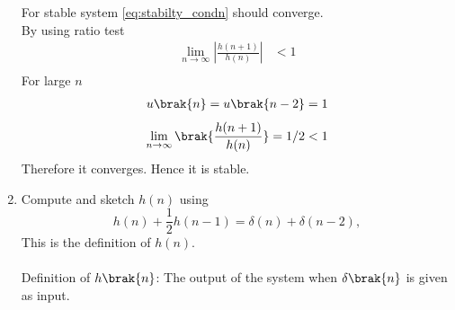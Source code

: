 \documentclass[journal,12pt,twocolumn]{IEEEtran}
\theoremstyle{remark}
\begin{document}
\begin{enumerate}[label=\thesection.\arabic*]
																																																						   \solution For stable system \eqref{eq:stabilty_condn} should converge.\\
																																																						   By using ratio test
																																																						   \begin{align}
																																																						       \lim_{n \to \infty}\left|\frac{h(n + 1)}{h(n)}\right|&<1 \\
																																																						       \end{align}
																																																						       For large $n$ 
																																																						       \begin{align}
																																																						           u\brak{n}=u\brak{n-2}=1
																																																							   \end{align}
																																																							   \begin{align}
																																																							     \lim_{n \to \infty}  \brak{\frac{h(n + 1)}{h(n)}} = 1/2 <1
																																																							     \end{align}
																																																							     Therefore it converges. Hence it is stable.
																																																							     \item 
																																																							     Compute and sketch $h(n)$ using 
																																																							     \begin{equation}
																																																							     \label{eq:iir_filter_h}
																																																							     h(n) + \frac{1}{2}h(n-1) = \delta(n) + \delta(n-2), 
																																																							     \end{equation}
																																																							     This is the definition of $h(n)$.
																																																							     \\
																																																							     \solution\\
																																																							     Definition of $h\brak{n}$: The output of the system when $\delta\brak{n}$ is given as input.\\


\end{enumerate}
\end{document}
